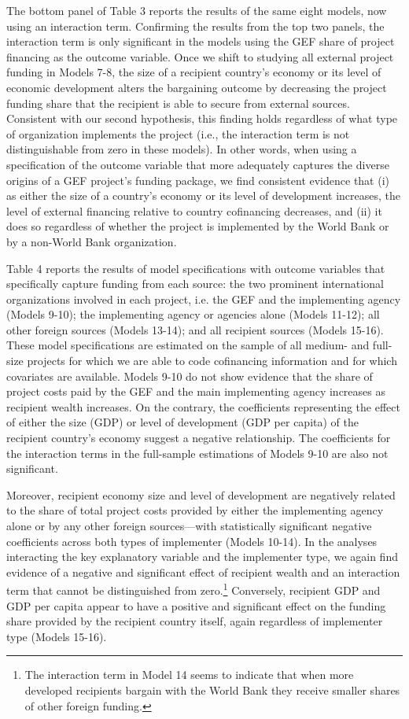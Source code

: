 \documentclass{article}
\begin{document}
The bottom panel of Table 3 reports the results of the same eight models, now using an interaction term.  Confirming the results from the top two panels, the interaction term is only significant in the models using the GEF share of project financing as the outcome variable.  Once we shift to studying all external project funding in Models 7-8, the size of a recipient country’s economy or its level of economic development alters the bargaining outcome by decreasing the project funding share that the recipient is able to secure from external sources.  Consistent with our second hypothesis, this finding holds regardless of what type of organization implements the project (i.e., the interaction term is not distinguishable from zero in these models).  In other words, when using a specification of the outcome variable that more adequately captures the diverse origins of a GEF project’s funding package, we find consistent evidence that (i) as either the size of a country’s economy or its level of development increases, the level of external financing relative to country cofinancing decreases, and (ii) it does so regardless of whether the project is implemented by the World Bank or by a non-World Bank organization. 

Table 4 reports the results of model specifications with outcome variables that specifically capture funding from each source: the two prominent international organizations involved in each project, i.e. the GEF and the implementing agency (Models 9-10); the implementing agency or agencies alone (Models 11-12); all other foreign sources (Models 13-14); and all recipient sources (Models 15-16).  These model specifications are estimated on the sample of all medium- and full-size projects for which we are able to code cofinancing information and for which covariates are available. Models 9-10 do not show evidence that the share of project costs paid by the GEF and the main implementing agency increases as recipient wealth increases.  On the contrary, the coefficients representing the effect of either the size (GDP) or level of development (GDP per capita) of the recipient country’s economy suggest a negative relationship.  The coefficients for the interaction terms in the full-sample estimations of Models 9-10 are also not significant. 

Moreover, recipient economy size and level of development are negatively related to the share of total project costs provided by either the implementing agency alone or by any other foreign sources---with statistically significant negative coefficients across both types of implementer (Models 10-14).  In the analyses interacting the key explanatory variable and the implementer type, we again find evidence of a negative and significant effect of recipient wealth and an interaction term that cannot be distinguished from zero.\footnote{The interaction term in Model 14 seems to indicate that when more developed recipients bargain with the World Bank they receive smaller shares of other foreign funding.}   Conversely, recipient GDP and GDP per capita appear to have a positive and significant effect on the funding share provided by the recipient country itself, again regardless of implementer type (Models 15-16). 
\end{document}
